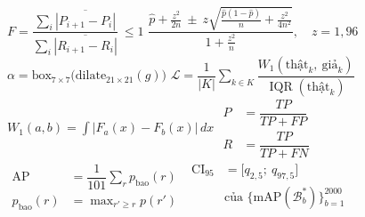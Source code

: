 \documentclass[border=1.5pt,multi=eqn]{standalone}
\newenvironment{eqn}[1]{\fontsize{18}{22}\selectfont\color[HTML]{#1}$\displaystyle}{$}
\begin{document}
\begin{eqn}{0E2238}F=\dfrac{\sum_i\overline{|P_{i+1}-P_i|}}{\sum_i\overline{|R_{i+1}-R_i|}}\ \le 1\end{eqn}
\begin{eqn}{0E2238}\dfrac{\hat p+\frac{z^{2}}{2n}\ \pm\ z\sqrt{\frac{\hat p(1-\hat p)}{n}+\frac{z^{2}}{4n^{2}}}}{1+\frac{z^{2}}{n}},\quad z=1{,}96\end{eqn}
\begin{eqn}{0E2238}\alpha=\mathrm{box}_{7\times7}\bigl(\mathrm{dilate}_{21\times21}(g)\bigr)\end{eqn}
\begin{eqn}{0E2238}\mathcal{L}=\dfrac{1}{|K|}\sum_{k\in K}\dfrac{W_1(\text{thật}_k,\ \text{giả}_k)}{\operatorname{IQR}(\text{thật}_k)}\end{eqn}
\begin{eqn}{0E2238}W_1(a,b)=\int\bigl|F_a(x)-F_b(x)\bigr|\,dx\end{eqn}
\begin{eqn}{0E2238}\begin{aligned}P&=\dfrac{TP}{TP+FP}\\ R&=\dfrac{TP}{TP+FN}\end{aligned}\end{eqn}
\begin{eqn}{0E2238}\begin{aligned}\mathrm{AP}&=\dfrac{1}{101}\sum_{r}p_{\text{bao}}(r)\\ p_{\text{bao}}(r)&=\max_{r'\ge r}p(r')\end{aligned}\end{eqn}
\begin{eqn}{0E2238}\begin{aligned}\mathrm{CI}_{95}&=\bigl[q_{2{,}5};\ q_{97{,}5}\bigr]\\ &\text{của }\bigl\{\mathrm{mAP}(\mathcal{B}^{*}_{b})\bigr\}_{b=1}^{2000}\end{aligned}\end{eqn}
\end{document}
